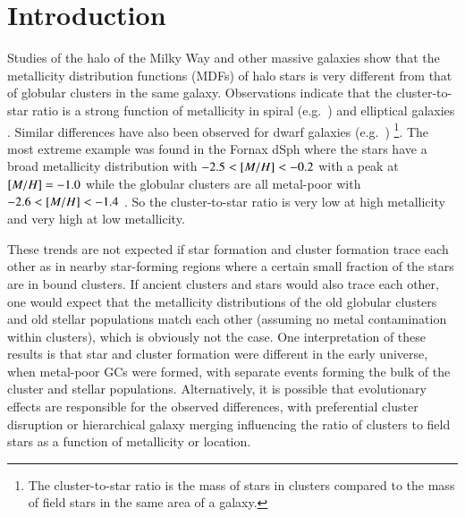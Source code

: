 \documentclass{aa}
\begin{document}
   \maketitle
%



\section{Introduction} \label{sec:intro}



     
 Studies of the halo of the Milky Way and other massive galaxies show that the metallicity distribution functions (MDFs) of halo stars is very different from that of globular clusters in the same galaxy. Observations indicate that the 
cluster-to-star ratio is a strong function of metallicity 
in spiral (e.g.~\citealt{carollo10, gratton12, durrell01, durrell04, chapman06,kalirai06}) and elliptical galaxies \citep[e.g.][]{harrisharris02, harris03, beasley08}. Similar differences  have also been observed for dwarf galaxies (e.g.~\citealt{beasley08, mackey04, sharina10}) \footnote{The cluster-to-star ratio is the mass of stars in clusters compared to the mass of field stars in the same area of a galaxy.}.
 The most extreme example was found in the Fornax dSph where the stars have a broad metallicity distribution with $-2.5 < \mbox{$[M/H]$} < -0.2$ with a peak at $\mbox{$[M/H]$} =-1.0$ while the globular clusters are all metal-poor with $-2.6 < \mbox{$[M/H]$} < -1.4$ \citep{larsen12b}. So the cluster-to-star ratio is very low at high metallicity and very high at low metallicity.

These trends are not expected if star formation and cluster formation trace each other as in nearby star-forming regions where a certain small fraction of the stars \citep[typically 5--10\%,][]{goddard10,kruijssen12d,adamo15b} are in bound clusters. If ancient clusters and stars would also trace each other, one would expect that the metallicity distributions of the old globular clusters and old stellar populations match each other (assuming no metal contamination within clusters), which is obviously not the case. One interpretation of these results is that star and cluster formation were different in the early universe, when metal-poor GCs were formed, with separate events forming the bulk of the cluster and stellar populations.  Alternatively, it is possible that evolutionary effects are responsible for the observed differences, with preferential cluster disruption or hierarchical galaxy merging influencing the ratio of clusters to field stars as a function of metallicity or location.
 
\end{document}
